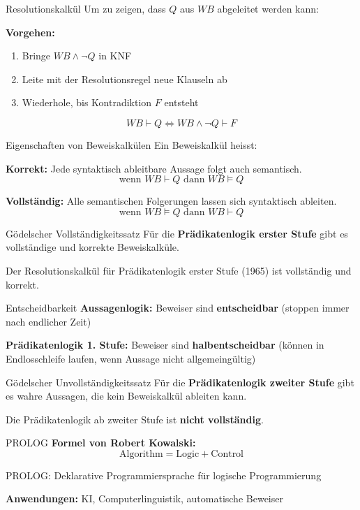 \documentclass[a4paper, fontsize=7pt]{scrartcl}
\begin{document}
\begin{mainbox}{Resolutionskalkül}
Um zu zeigen, dass $Q$ aus $WB$ abgeleitet werden kann:

\textbf{Vorgehen:}
\begin{enumerate}
    \item Bringe $WB \land \neg Q$ in KNF
    \item Leite mit der Resolutionsregel neue Klauseln ab
    \item Wiederhole, bis Kontradiktion $F$ entsteht
\end{enumerate}

$$WB \vdash Q \iff WB \land \neg Q \vdash F$$
\end{mainbox}

\begin{mainbox}{Eigenschaften von Beweiskalkülen}
Ein Beweiskalkül heisst:

\textbf{Korrekt:} Jede syntaktisch ableitbare Aussage folgt auch semantisch.
$$\text{wenn } WB \vdash Q \text{ dann } WB \models Q$$

\textbf{Vollständig:} Alle semantischen Folgerungen lassen sich syntaktisch ableiten.
$$\text{wenn } WB \models Q \text{ dann } WB \vdash Q$$
\end{mainbox}

\begin{mainbox}{Gödelscher Vollständigkeitssatz}
Für die \textbf{Prädikatenlogik erster Stufe} gibt es vollständige und korrekte Beweiskalküle.

Der Resolutionskalkül für Prädikatenlogik erster Stufe (1965) ist vollständig und korrekt.
\end{mainbox}

\begin{subbox}{Entscheidbarkeit}
\textbf{Aussagenlogik:} Beweiser sind \textbf{entscheidbar} (stoppen immer nach endlicher Zeit)

\textbf{Prädikatenlogik 1. Stufe:} Beweiser sind \textbf{halbentscheidbar} (können in Endlosschleife laufen, wenn Aussage nicht allgemeingültig)
\end{subbox}

\begin{mainbox}{Gödelscher Unvollständigkeitssatz}
Für die \textbf{Prädikatenlogik zweiter Stufe} gibt es wahre Aussagen, die kein Beweiskalkül ableiten kann.

Die Prädikatenlogik ab zweiter Stufe ist \textbf{nicht vollständig}.
\end{mainbox}

\begin{subbox}{PROLOG}
\textbf{Formel von Robert Kowalski:}
$$\text{Algorithm} = \text{Logic} + \text{Control}$$

PROLOG: Deklarative Programmiersprache für logische Programmierung

\textbf{Anwendungen:} KI, Computerlinguistik, automatische Beweiser
\end{subbox}
\end{document}
